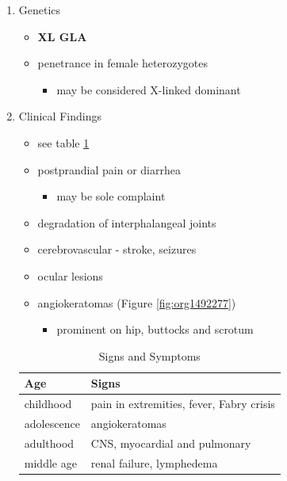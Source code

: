 \documentclass{scrartcl}
\begin{document}
\begin{enumerate}
\item Genetics
\label{sec:org8418622}
\begin{itemize}
\item \textbf{XL GLA}
\item penetrance in female heterozygotes
\begin{itemize}
\item may be considered X-linked dominant
\end{itemize}
\end{itemize}

\item Clinical Findings
\label{sec:orgf633b28}
\begin{itemize}
\item see table \ref{tab:orgdb9f160}
\item postprandial pain or diarrhea
\begin{itemize}
\item may be sole complaint
\end{itemize}
\item degradation of interphalangeal joints
\item cerebrovascular - stroke, seizures
\item ocular lesions
\item angiokeratomas (Figure \ref{fig:org1492277})
\begin{itemize}
\item prominent on hip, buttocks and scrotum
\end{itemize}
\end{itemize}

\begin{table}[htbp]
\caption{\label{tab:orgdb9f160}
Signs and Symptoms}
\centering
\begin{tabular}{ll}
Age & Signs\\
\hline
childhood & pain in extremities, fever, Fabry crisis \footnotemark\\
adolescence & angiokeratomas\\
adulthood & CNS, myocardial and pulmonary\\
middle age & renal failure, lymphedema\\
\end{tabular}
\end{table}


\end{enumerate}
\end{document}
